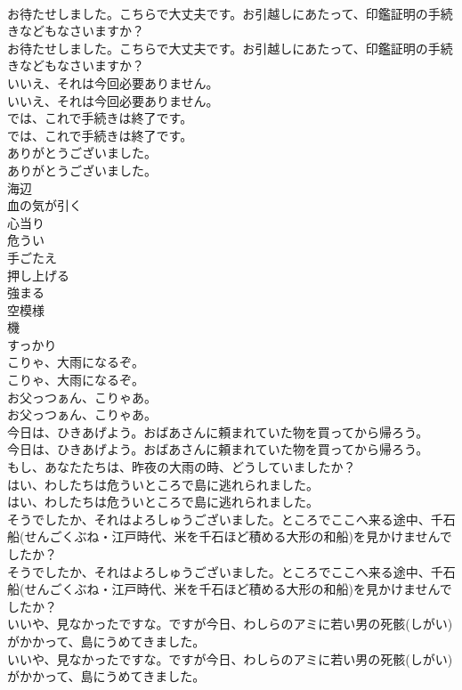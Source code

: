 \documentclass[8pt]{extreport}
\begin{document}
\begin{CJK}{UTF8}{min}
\\	お待たせしました。こちらで大丈夫です。お引越しにあたって、印鑑証明の手続きなどもなさいますか？	
\\	お待たせしました。こちらで大丈夫です。お引越しにあたって、印鑑証明の手続きなどもなさいますか？ 
\\	いいえ、それは今回必要ありません。	
\\	いいえ、それは今回必要ありません。 
\\	では、これで手続きは終了です。	
\\	では、これで手続きは終了です。 
\\	ありがとうございました。	
\\	ありがとうございました。 
\\	海辺
\\	血の気が引く
\\	心当り
\\	危うい
\\	手ごたえ
\\	押し上げる
\\	強まる
\\	空模様
\\	機
\\	すっかり
\\	こりゃ、大雨になるぞ。	
\\	こりゃ、大雨になるぞ。 
\\	お父っつぁん、こりゃあ。	
\\	お父っつぁん、こりゃあ。 
\\	今日は、ひきあげよう。おばあさんに頼まれていた物を買ってから帰ろう。	
\\	今日は、ひきあげよう。おばあさんに頼まれていた物を買ってから帰ろう。 
\\	もし、あなたたちは、昨夜の大雨の時、どうしていましたか？ 
\\	はい、わしたちは危ういところで島に逃れられました。	
\\	はい、わしたちは危ういところで島に逃れられました。 
\\	そうでしたか、それはよろしゅうございました。ところでここへ来る途中、千石船(せんごくぶね・江戸時代、米を千石ほど積める大形の和船)を見かけませんでしたか？	
\\	そうでしたか、それはよろしゅうございました。ところでここへ来る途中、千石船(せんごくぶね・江戸時代、米を千石ほど積める大形の和船)を見かけませんでしたか？ 
\\	いいや、見なかったですな。ですが今日、わしらのアミに若い男の死骸(しがい)がかかって、島にうめてきました。	
\\	いいや、見なかったですな。ですが今日、わしらのアミに若い男の死骸(しがい)がかかって、島にうめてきました。　 

\end{CJK}
\end{document}
